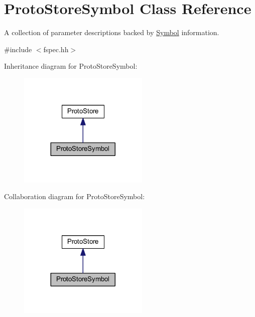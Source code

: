 \hypertarget{class_proto_store_symbol}{}\section{Proto\+Store\+Symbol Class Reference}
\label{class_proto_store_symbol}


A collection of parameter descriptions backed by \mbox{\hyperlink{class_symbol}{Symbol}} information.  




{\ttfamily \#include $<$fspec.\+hh$>$}



Inheritance diagram for Proto\+Store\+Symbol\+:
\nopagebreak
\begin{figure}[H]
\begin{center}
\leavevmode
\includegraphics[width=176pt]{class_proto_store_symbol__inherit__graph}
\end{center}
\end{figure}


Collaboration diagram for Proto\+Store\+Symbol\+:
\nopagebreak
\begin{figure}[H]
\begin{center}
\leavevmode
\includegraphics[width=176pt]{class_proto_store_symbol__coll__graph}
\end{center}
\end{figure}
